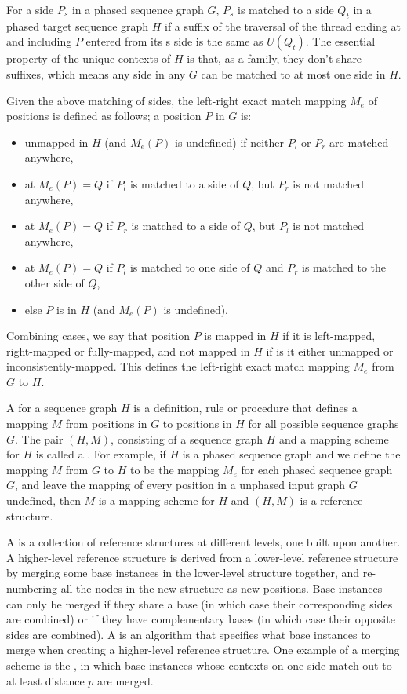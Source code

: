 \documentclass[11pt,proposal]{ucthesis}
\begin{document}
For a side $P_s$ in a phased sequence graph $G$, $P_s$ is matched to a side $Q_t$ in a phased target sequence graph $H$ if a suffix of the traversal of the thread ending at and including $P$ entered from its s side is the same as $U(Q_t)$. The essential property of the unique contexts of $H$ is that, as a family, they don’t share suffixes, which means any side in any $G$ can be matched to at most one side in $H$. 

Given the above matching of sides, the left-right exact match mapping $M_e$ of positions is defined as follows; a position $P$ in $G$ is:
\begin{itemize}
\item unmapped in $H$ (and $M_e(P)$ is undefined) if neither $P_l$ or $P_r$ are matched anywhere, 
\item {} at $M_e(P) = Q$ if $P_l$  is matched to a side of $Q$, but $P_r$  is not matched anywhere, 
\item {} at $M_e(P) = Q$ if $P_r$ is matched to a side of $Q$, but $P_l$ is not matched anywhere,
\item {} at $M_e(P) = Q$ if $P_l$  is matched to one side of $Q$ and $P_r$ is matched to the other side of $Q$,
\item else $P$ is  in $H$ (and $M_e(P)$ is undefined).
\end{itemize}

Combining cases, we say that position $P$ is mapped in $H$ if it is left-mapped, right-mapped or fully-mapped, and not mapped in $H$ if is it either unmapped or inconsistently-mapped. This defines the left-right exact match mapping $M_e$ from $G$ to $H$. 

A  for a sequence graph $H$ is a definition, rule or procedure that defines a mapping $M$ from positions in $G$ to positions in $H$ for all possible sequence graphs $G$. The pair $(H, M)$, consisting of a sequence graph $H$ and a mapping scheme for $H$ is called a .  For example, if $H$ is a phased sequence graph and we define the mapping $M$ from $G$ to $H$ to be the mapping $M_e$ for each phased sequence graph $G$, and leave the mapping of every position in a unphased input graph $G$ undefined, then $M$ is a mapping scheme for $H$ and $(H, M)$ is a reference structure. 

A  is a collection of reference structures at different levels, one built upon another. A higher-level reference structure is derived from a lower-level reference structure by merging some base instances in the lower-level structure together, and re-numbering all the nodes in the new structure as new positions. Base instances can only be merged if they share a base (in which case their corresponding sides are combined) or if they have complementary bases (in which case their opposite sides are combined). A  is an algorithm that specifies what base instances to merge when creating a higher-level reference structure. One example of a merging scheme is the , in which base instances whose contexts on one side match out to at least distance $p$ are merged.
\end{document}
